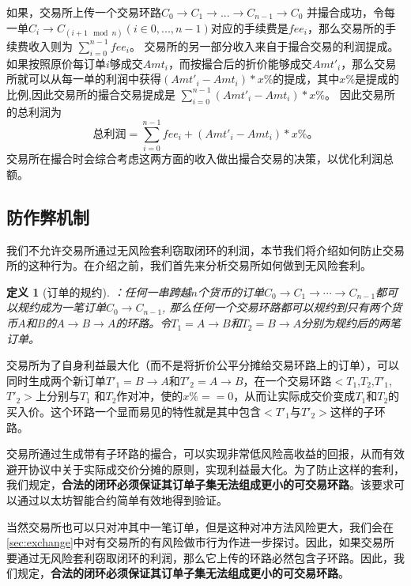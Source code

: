 \documentclass[UTF8,nofonts]{ctexart}
\newtheorem{definition}{定义}[section]
\begin{document}
如果，交易所上传一个交易环路$C_0 \rightarrow C_1 \rightarrow ... \rightarrow C_{n-1} \rightarrow C_{0}$ 并撮合成功，令每一单$C_{i}\rightarrow C_{(i+1\mod n)}$$(i\in{0,...,n-1})$对应的手续费是$fee_{i}$，那么交易所的手续费收入则为
$
\sum^{n-1}_{i=0}fee_{i}\text{。}
$
交易所的另一部分收入来自于撮合交易的利润提成。如果按照原价每订单$i$够成交$Amt_{i}$，而按撮合后的折价能够成交$Amt'_{i}$，那么交易所就可以从每一单的利润中获得$(Amt'_{i}-Amt_{i})*x\%$的提成，其中$x\%$是提成的比例,因此交易所的撮合交易提成是
$
\sum^{n-1}_{i=0}(Amt'_{i}-Amt_{i})*x\%\text{。}
$
因此交易所的总利润为
$$
\text{总利润} = \sum^{n-1}_{i=0}fee_{i}+(Amt'_{i}-Amt_{i})*x\%\text{。}
$$
交易所在撮合时会综合考虑这两方面的收入做出撮合交易的决策，以优化利润总额。

\subsection{防作弊机制}
我们不允许交易所通过无风险套利窃取闭环的利润，本节我们将介绍如何防止交易所的这种行为。在介绍之前，我们首先来分析交易所如何做到无风险套利。
\begin{definition}[订单的规约]：任何一串跨越$n$个货币的订单$C_{0}\rightarrow C_{1}\rightarrow \cdots \rightarrow C_{n-1}$都可以规约成为一笔订单$C_{0} \rightarrow C_{n-1}$, 那么任何一个交易环路都可以规约到只有两个货币$A$和$B$的$A\rightarrow B\rightarrow A$的环路。令$T_{1} = A\rightarrow B$和$T_{2} = B\rightarrow A$分别为规约后的两笔订单。
\end{definition}

交易所为了自身利益最大化（而不是将折价公平分摊给交易环路上的订单），可以同时生成两个新订单$T'_{1} = B\rightarrow A$和$T'_{2} = A\rightarrow B$，在一个交易环路$<T_{1}$,$T_{2}$,$T'_{1}$,$T'_{2}>$上分别与$T_{1}$ 和$T_{2}$作对冲，使的$x\%==0$，从而让实际成交价变成$T_{1}$和$T_{2}$的买入价。这个环路一个显而易见的特性就是其中包含$<T'_{1}$与$T'_{2}>$这样的子环路。

交易所通过生成带有子环路的撮合，可以实现非常低风险高收益的回报，从而有效避开协议中关于实际成交价分摊的原则，实现利益最大化。为了防止这样的套利，我们规定，{\bfseries 合法的闭环必须保证其订单子集无法组成更小的可交易环路}。该要求可以通过以太坊智能合约简单有效地得到验证。

当然交易所也可以只对冲其中一笔订单，但是这种对冲方法风险更大，我们会在\ref{sec:exchange}中对有交易所的有风险做市行为作进一步探讨。因此，如果交易所要通过无风险套利窃取闭环的利润，那么它上传的环路必然包含子环路。因此，我们规定，{\bfseries 合法的闭环必须保证其订单子集无法组成更小的可交易环路}。
\end{document}
